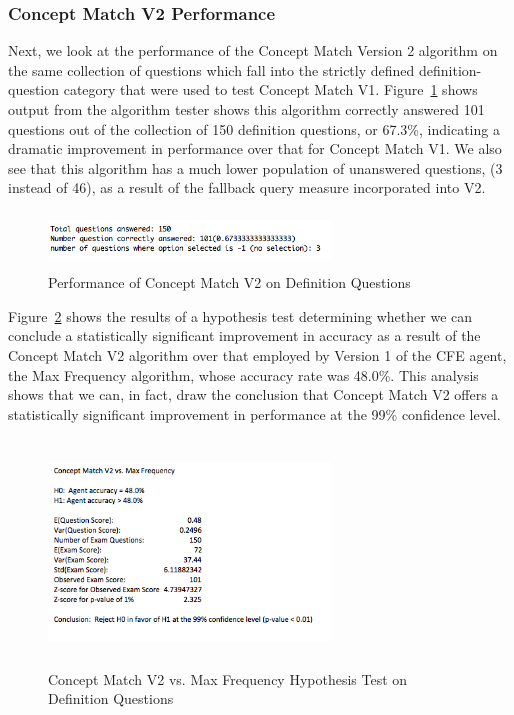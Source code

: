 \subsubsection{Concept Match V2 Performance}

Next, we look at the performance of the Concept Match Version 2 algorithm on the same collection of questions which fall into the strictly defined definition-question category that were used to test Concept Match V1.  Figure~\ref{fig:concept_match_v2_training_set_results_def} shows output from the algorithm tester shows this algorithm correctly answered 101 questions out of the collection of 150 definition questions, or 67.3\%, indicating a dramatic improvement in performance over that for Concept Match V1.  We also see that this algorithm has a much lower population of unanswered questions, (3 instead of 46), as a result of the fallback query measure incorporated into V2.



\begin{figure}
\centering
\vspace{1.0in}
\includegraphics[width=75mm, height=15mm]{concept_match_v2_training_set_results_def.png}
\caption{Performance of Concept Match V2 on Definition Questions}
\label{fig:concept_match_v2_training_set_results_def}
\end{figure}

Figure~\ref{fig:concept_match_v2_hypothesis_test} shows the results of a hypothesis test determining whether we can conclude a statistically significant improvement in accuracy as a result of the Concept Match V2 algorithm over that employed by Version 1 of the CFE agent, the Max Frequency algorithm, whose accuracy rate was 48.0\%.  This analysis shows that we can, in fact, draw the conclusion that Concept Match V2 offers a statistically significant improvement in performance at the 99\% confidence level.

\begin{figure}
\centering
\vspace{1.0in}
\includegraphics[width=75mm, height=60mm]{concept_match_v2_hypothesis_test.png}
\caption{Concept Match V2 vs. Max Frequency Hypothesis Test on Definition Questions}
\label{fig:concept_match_v2_hypothesis_test}
\end{figure}


